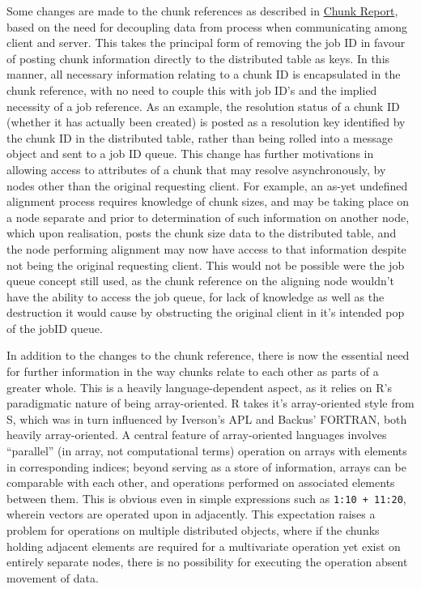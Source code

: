 \documentclass[a4paper,10pt]{article}
\begin{document}
Some changes are made to the chunk references as described in
\href{chunk-report.pdf}{Chunk Report}, based on the need for decoupling data
from process when communicating among client and server.
This takes the principal form of removing the job ID in favour of posting chunk
information directly to the distributed table as keys.
In this manner, all necessary information relating to a chunk ID is
encapsulated in the chunk reference, with no need to couple this with job ID's
and the implied necessity of a job reference.
As an example, the resolution status of a chunk ID (whether it has actually
been created) is posted as a resolution key identified by the chunk ID in the
distributed table, rather than being rolled into a message object and sent to a
job ID queue.
This change has further motivations in allowing access to attributes of a chunk
that may resolve asynchronously, by nodes other than the original requesting
client.
For example, an as-yet undefined alignment process requires knowledge of chunk
sizes, and may be taking place on a node separate and prior to determination of
such information on another node, which upon realisation, posts the chunk size
data to the distributed table, and the node performing alignment may now have
access to that information despite not being the original requesting client.
This would not be possible were the job queue concept still used, as the chunk
reference on the aligning node wouldn't have the ability to access the job
queue, for lack of knowledge as well as the destruction it would cause by
obstructing the original client in it's intended pop of the jobID queue.

In addition to the changes to the chunk reference, there is now the essential
need for further information in the way chunks relate to each other as parts of
a greater whole.
This is a heavily language-dependent aspect, as it relies on R's paradigmatic
nature of being array-oriented.
R takes it's array-oriented style from S, which was in turn influenced by
Iverson's APL and Backus' FORTRAN, both heavily
array-oriented\cite{becker1994shistory}\cite{iverson2007notation}.
A central feature of array-oriented languages involves ``parallel'' (in array,
not computational terms) operation on arrays with elements in corresponding
indices; beyond serving as a store of information, arrays can be comparable
with each other, and operations performed on associated elements between them.
This is obvious even in simple expressions such as 
\texttt{1:10 + 11:20}, wherein vectors are operated upon in
adjacently.
This expectation raises a problem for operations on multiple distributed
objects, where if the chunks holding adjacent elements are required for a
multivariate operation yet exist on entirely separate nodes, there is no
possibility for executing the operation absent movement of data.
\end{document}
